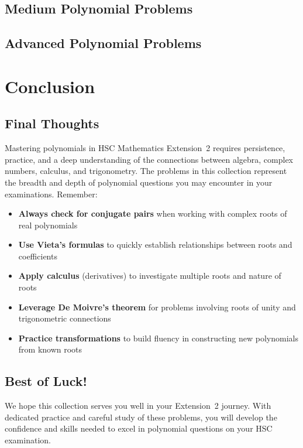 \documentclass[12pt]{article}
\begin{document}
\subsection{Medium Polynomial Problems}


\subsection{Advanced Polynomial Problems}


\newpage
\section{Conclusion}

\subsection{Final Thoughts}
Mastering polynomials in HSC Mathematics Extension~2 requires persistence, 
practice, and a deep understanding of the connections between algebra, 
complex numbers, calculus, and trigonometry. 
The problems in this collection represent the breadth and depth of 
polynomial questions you may encounter in your examinations. Remember:

\begin{itemize}[leftmargin=*]
  \item \textbf{Always check for conjugate pairs} when working with complex roots of real polynomials
  \item \textbf{Use Vieta's formulas} to quickly establish relationships between roots and coefficients
  \item \textbf{Apply calculus} (derivatives) to investigate multiple roots and nature of roots
  \item \textbf{Leverage De Moivre's theorem} for problems involving roots of unity and trigonometric connections
  \item \textbf{Practice transformations} to build fluency in constructing new polynomials from known roots
\end{itemize}

\subsection{Best of Luck!}
We hope this collection serves you well in your Extension~2 journey. With dedicated practice and careful study of these problems, you will develop the confidence and skills needed to excel in polynomial questions on your HSC examination.
\end{document}
